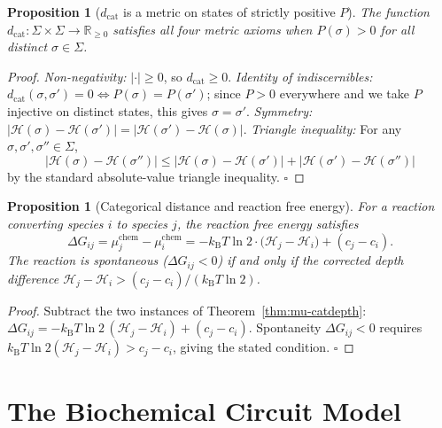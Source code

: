 \documentclass[twocolumn,10pt,a4paper]{article}
\newcommand{\kB}{k_{\mathrm{B}}}
\newcommand{\Hcat}{\mathcal{H}}
\newcommand{\dcat}{d_{\mathrm{cat}}}
\newtheorem{proposition}[theorem]{Proposition}
\begin{document}
\begin{proposition}[$\dcat$ is a metric on states of strictly positive $P$]
\label{prop:catdist-metric}
The function $\dcat:\Sigma\times\Sigma\to\mathbb{R}_{\geq 0}$ satisfies all
four metric axioms when $P(\sigma)>0$ for all distinct $\sigma\in\Sigma$.
\end{proposition}

\begin{proof}
\emph{Non-negativity:} $|\cdot|\geq 0$, so $\dcat\geq 0$.
\emph{Identity of indiscernibles:} $\dcat(\sigma,\sigma')=0
\Leftrightarrow P(\sigma)=P(\sigma')$; since $P>0$ everywhere and we take $P$
injective on distinct states, this gives $\sigma=\sigma'$.
\emph{Symmetry:} $|\Hcat(\sigma)-\Hcat(\sigma')|=|\Hcat(\sigma')-\Hcat(\sigma)|$.
\emph{Triangle inequality:} For any $\sigma,\sigma',\sigma''\in\Sigma$,
\[
  |\Hcat(\sigma)-\Hcat(\sigma'')| \leq |\Hcat(\sigma)-\Hcat(\sigma')|
  +|\Hcat(\sigma')-\Hcat(\sigma'')|
\]
by the standard absolute-value triangle inequality.  $\square$
\end{proof}

\begin{proposition}[Categorical distance and reaction free energy]
\label{prop:catdist-dG}
For a reaction converting species $i$ to species $j$, the reaction free energy
satisfies
\begin{equation}
  \Delta G_{ij} = \mu_j^{\mathrm{chem}}-\mu_i^{\mathrm{chem}}
    = -\kB T\ln 2\cdot\bigl(\Hcat_j-\Hcat_i\bigr) + (c_j-c_i).
  \label{eq:catdist-dG}
\end{equation}
The reaction is spontaneous ($\Delta G_{ij}<0$) if and only if the corrected
depth difference $\Hcat_j - \Hcat_i > (c_j-c_i)/(\kB T\ln 2)$.
\end{proposition}

\begin{proof}
Subtract the two instances of Theorem~\ref{thm:mu-catdepth}:
$\Delta G_{ij} = -\kB T\ln 2\,(\Hcat_j-\Hcat_i)+(c_j-c_i)$.
Spontaneity $\Delta G_{ij}<0$ requires
$\kB T\ln 2(\Hcat_j-\Hcat_i) > c_j-c_i$, giving the stated condition.
$\square$
\end{proof}

\section{The Biochemical Circuit Model}
\label{sec:circuit}
\end{document}
